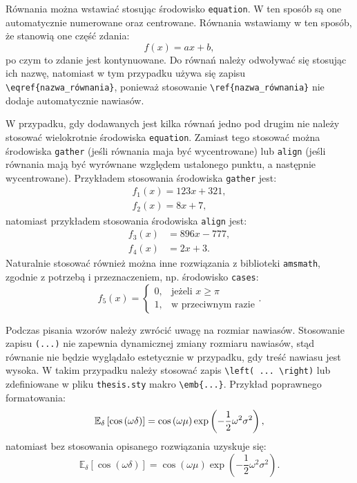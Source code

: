 Równania można wstawiać stosując środowisko \verb|equation|. W ten sposób są one automatycznie numerowane oraz centrowane. Równania wstawiamy w ten sposób, że stanowią one część zdania:
\begin{equation}
f(x) = ax + b \label{eq:rownanie_1},
\end{equation}
po czym to zdanie jest kontynuowane. Do równań należy odwoływać się stosując ich nazwę, natomiast w tym przypadku używa się zapisu \verb|\eqref{nazwa_równania}|, ponieważ stosowanie \verb|\ref{nazwa_równania}| nie dodaje automatycznie nawiasów.

W przypadku, gdy dodawanych jest kilka równań jedno pod drugim nie należy stosować wielokrotnie środowiska \verb|equation|. Zamiast tego stosować można środowiska \verb|gather| (jeśli równania maja być wycentrowane) lub \verb|align| (jeśli równania mają być wyrównane względem ustalonego punktu, a następnie wycentrowane). Przykładem stosowania środowiska \verb|gather| jest:
\begin{gather}
f_{1}(x) = 123 x + 321 \label{eq:rownanie_2}, \\
f_{2}(x) = 8 x + 7 \label{eq:rownanie_3},
\end{gather}
natomiast przykładem stosowania środowiska \verb|align| jest:
\begin{align}
f_{3}(x) &= 896 x - 777 \label{eq:rownanie_4}, \\
f_{4}(x) &= 2 x + 3 \label{eq:rownanie_5}.
\end{align}
Naturalnie stosować również można inne rozwiązania z biblioteki \verb|amsmath|, zgodnie z potrzebą i przeznaczeniem, np. środowisko \verb|cases|:
\begin{equation}
f_{5}(x) =
\begin{cases}
0, & \text{jeżeli $x \ge \pi$}  \\
1, & \text{w przeciwnym razie}
\end{cases}
\label{eq:rownanie_6}.
\end{equation}

Podczas pisania wzorów należy zwrócić uwagę na rozmiar nawiasów. Stosowanie zapisu \verb|(...)| nie zapewnia dynamicznej zmiany rozmiaru nawiasów, stąd równanie nie będzie wyglądało estetycznie w przypadku, gdy treść nawiasu jest wysoka. W takim przypadku należy stosować zapis \verb|\left( ... \right)| lub zdefiniowane w pliku \texttt{thesis.sty} makro \verb|\emb{...}|. Przykład poprawnego formatowania:
\begin{equation}
\mathbb{E}_\delta \left[ \cos \left(\omega \delta\right) \right] = \cos \left(\omega \mu\right) \exp \left(-\frac{1}{2} \omega^2 \sigma^2\right) \label{eq:rownanie_7_dobrze},
\end{equation}
natomiast bez stosowania opisanego rozwiązania uzyskuje się:
\begin{equation}
\mathbb{E}_\delta [ \cos (\omega \delta) ] = \cos (\omega \mu) \exp (-\frac{1}{2} \omega^2 \sigma^2) \label{eq:rownanie_7_zle}.
\end{equation}

